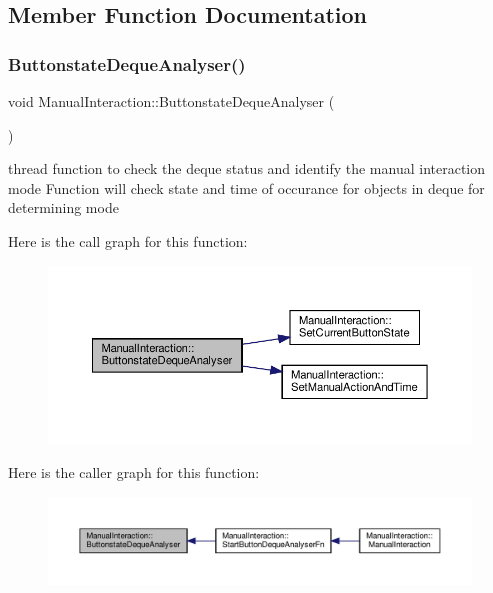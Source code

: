 \subsection{Member Function Documentation}
\mbox{\label{classManualInteraction_a7347f8414fc849ab263b3d717add9484}} 
\subsubsection{\texorpdfstring{Buttonstate\+Deque\+Analyser()}{ButtonstateDequeAnalyser()}}
{\footnotesize\ttfamily void Manual\+Interaction\+::\+Buttonstate\+Deque\+Analyser (\begin{DoxyParamCaption}{ }\end{DoxyParamCaption})\hspace{0.3cm}{\ttfamily [private]}}



thread function to check the deque status and identify the manual interaction mode Function will check state and time of occurance for objects in deque for determining mode 

Here is the call graph for this function\+:
\nopagebreak
\begin{figure}[H]
\begin{center}
\leavevmode
\includegraphics[width=350pt]{classManualInteraction_a7347f8414fc849ab263b3d717add9484_cgraph}
\end{center}
\end{figure}
Here is the caller graph for this function\+:
\nopagebreak
\begin{figure}[H]
\begin{center}
\leavevmode
\includegraphics[width=350pt]{classManualInteraction_a7347f8414fc849ab263b3d717add9484_icgraph}
\end{center}
\end{figure}
\mbox{\label{classManualInteraction_ae1279a3bd154b517aa9ad701a93f88c6}} 
